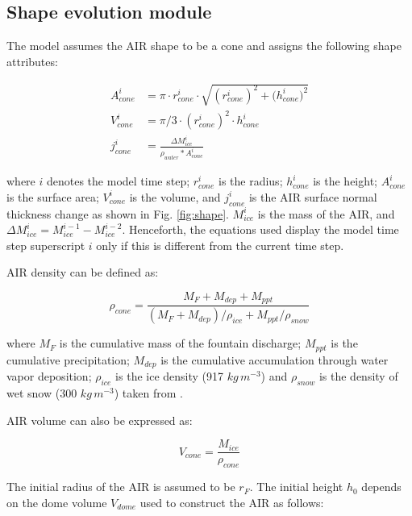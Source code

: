 \subsection{Shape evolution module} \label{sec:shape}

The model assumes the AIR shape to be a cone and assigns the following shape attributes:

\begin{subequations}
	\begin{align}
		\label{eq:A}
		A_{cone}^i & = \pi \cdot r_{cone}^i \cdot \sqrt{{(r_{cone}^i)}^2 + {(h_{cone}^i})^ 2} \\
		\label{eq:V}
		V_{cone}^i & = \pi/3 \cdot {(r_{cone}^i)}^2 \cdot h_{cone}^i                          \\
		\label{eq:thickness}
		j_{cone}^i & =\frac{\Delta M_{ice}^i}{\rho_{water}* A_{cone}^i}
	\end{align}
\end{subequations}

where $i$ denotes the model time step; $r_{cone}^i$ is the radius; $h_{cone}^i$ is the height; $A_{cone}^i$ is
the surface area; $V_{cone}^i$ is the volume, and $j_{cone}^i$ is the AIR surface normal thickness change as shown
in Fig. \ref{fig:shape}. $M_{ice}^i$ is the mass of the AIR, and $\Delta M_{ice}^i = M_{ice}^{i-1} -
	M_{ice}^{i-2}$. Henceforth, the equations used display the model time step superscript $i$ only if this is different
from the current time step.

AIR density can be defined as:

\begin{equation}
	\rho_{cone} = \frac{M_{F} + M_{dep} + M_{ppt}}{(M_{F} + M_{dep})/\rho_{ice} + M_{ppt}/\rho_{snow}}
\end{equation}

where $M_F$ is the cumulative mass of the fountain discharge; $M_{ppt}$ is the cumulative precipitation;
$M_{dep}$ is the cumulative accumulation through water vapor deposition; $\rho_{ice}$ is the ice density (917
$kg\,m^{-3}$) and $\rho_{snow}$ is the density of wet snow (300 $kg\,m^{-3}$) taken from
\cite{cuffeyPhysicsGlaciers2010}.

AIR volume can also be expressed as:

\begin{equation} V_{cone} =\frac{M_{ice}} {\rho_{cone}} \label{eq:V1} \end{equation}

The initial radius of the AIR is assumed to be $r_F$. The initial height $h_0$ depends on the dome volume
$V_{dome}$ used to construct the AIR as follows:

